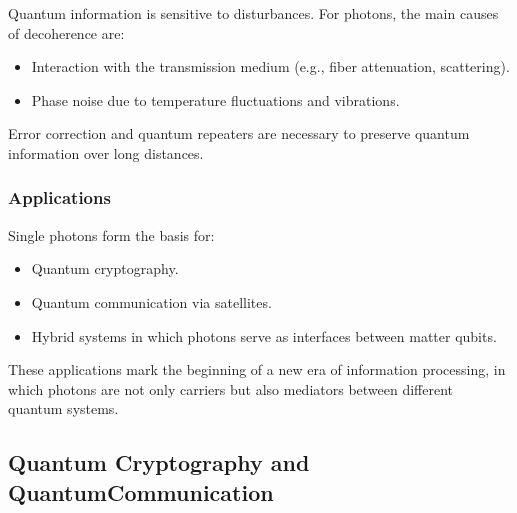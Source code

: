 Quantum information is sensitive to disturbances. For photons, the main causes of decoherence are:
\begin{itemize}
	\item Interaction with the transmission medium (e.g., fiber attenuation, scattering).
	\item Phase noise due to temperature fluctuations and vibrations.
\end{itemize}
Error correction and quantum repeaters are necessary to preserve quantum information over long distances.
\newpage
\noindent
\subsubsection{Applications}

Single photons form the basis for:
\begin{itemize}
	\item Quantum cryptography.
	\item Quantum communication via satellites.
	\item Hybrid systems in which photons serve as interfaces between matter qubits.
\end{itemize}
These applications mark the beginning of a new era of information processing, in which photons are not only carriers but also mediators between different quantum systems.

\subsection{Quantum Cryptography and  Quantum\newline Communication} \label{sec:quantum_crypto}

